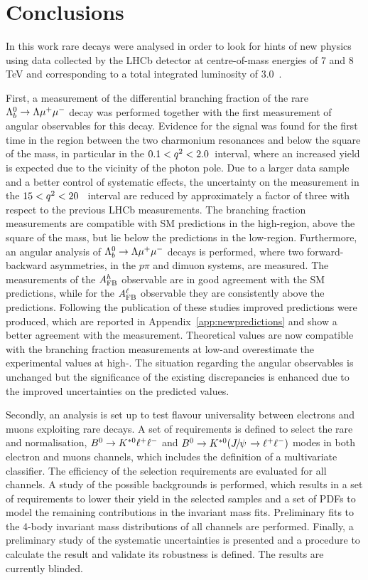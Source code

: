 \chapter{Conclusions}

In this work rare decays were analysed in order to look for hints of new physics using data collected by the LHCb 
detector at centre-of-mass energies of 7 and 8 TeV and corresponding to a total integrated luminosity of 3.0~\invfb.

First, a measurement of the differential branching fraction of the rare $\Lambda^0_b\rightarrow\Lambda\mu^+\mu^-$ decay was performed together
with the first measurement of angular observables for this decay.
Evidence for the signal was found for the first time in the \qsq region between the two charmonium resonances and 
below the square of the \jpsi mass, in particular in the $0.1 < q^2 < 2.0$~\gevgevcccc interval, 
where an increased yield is expected due to the vicinity of the photon pole. 
Due to a larger data sample and a better control of systematic effects, the uncertainty on the measurement in the $15 < q^2 < 20$~\gevgevcccc
interval are reduced by approximately a factor of three with respect to the previous LHCb measurements. 
The branching fraction measurements are compatible with SM predictions in the high-\qsq region, above the square
 of the \jpsi mass, but lie below the predictions in the low-\qsq region. Furthermore, an angular analysis of $\Lambda^0_b\rightarrow\Lambda\mu^+\mu^-$ decays
 is performed, where two forward-backward asymmetries, in the $p\pi$ and dimuon systems, are measured. The measurements
 of the $A_{\rm FB}^h$ observable are in good agreement with the SM predictions, while for the $A_{\rm FB}^\ell$ observable
 they are consistently above the predictions. Following the publication of these studies improved predictions
 were produced, which are reported in Appendix~\ref{app:newpredictions} and show a better agreement with the measurement. 
 Theoretical values are now compatible
 with the branching fraction measurements at low-\qsq and overestimate the experimental 
 values at high-\qsq. The situation regarding the angular observables is unchanged but the 
 significance of the existing discrepancies is enhanced due to the improved uncertainties on the predicted values.
 
Secondly, an analysis is set up to test flavour universality between electrons and muons exploiting rare decays.
A set of requirements is defined to select the rare and normalisation, $B^0\rightarrow K^{*0}\ell^+ \ell^-$ and $\Bz\to\Kstarz(\jpsi\to\ll)$ modes
in both electron and muons channels, which includes the definition of a multivariate classifier. 
The efficiency of the selection requirements are evaluated for all channels.
A study of the possible backgrounds is performed, which results in
a set of requirements to lower their yield in the selected samples and a set of PDFs to model
the remaining contributions in the invariant mass fits. Preliminary fits to the 4-body invariant mass distributions
of all channels are performed. Finally, a preliminary study of the systematic uncertainties is presented and
a procedure to calculate the result and validate its robustness is defined. The results are currently blinded.



